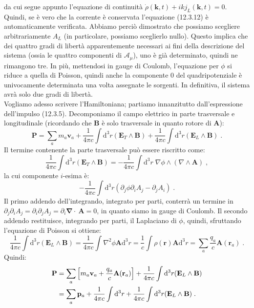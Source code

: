 \documentclass[10pt,a4paper]{report}
\theoremstyle{definition}
\numberwithin{equation}{section}
\newcommand{\diff}[1][]{\mathrm{d}#1}
\newcommand{\bnabla}{\boldsymbol{\nabla}}
\begin{document}
da cui segue appunto l'equazione di continuità $\dot{\rho}(\mathbf{k},t)+ikj_L(\mathbf{k},t)=0$. Quindi, se è vero che la corrente è conservata l'equazione (12.3.12) è automaticamente verificata. Abbiamo perciò dimostrato che possiamo scegliere arbitrariamente $A_L$ (in particolare, possiamo sceglierlo nullo). Questo implica che dei quattro gradi di libertà apparentemente necessari ai fini della descrizione del sistema (ossia le quattro componenti di $\mathcal{A}_{\mu}$), uno è già determinato, quindi ne rimangono tre. In più, mettendosi in gauge di Coulomb, l'equazione per $\phi$ si riduce a quella di Poisson, quindi anche la componente 0 del quadripotenziale è univocamente determinata una volta assegnate le sorgenti. In definitiva, il sistema avrà solo due gradi di libertà. \\
Vogliamo adesso scrivere l'Hamiltoniana; partiamo innanzitutto dall'espressione dell'impulso (12.3.5). Decomponiamo il campo elettrico in parte trasversale e longitudinale (ricordando che $\mathbf{B}$ è solo trasversale in quanto rotore di $\mathbf{A}$):
\begin{equation}
\mathbf{P}=\sum_a m_a\mathbf{v}_a+\frac{1}{4\pi c}\int\diff^3{r}(\mathbf{E}_T\wedge\mathbf{B})+\frac{1}{4\pi c}\int\diff^3{r}(\mathbf{E}_L\wedge\mathbf{B})\;.
\end{equation}
Il termine contenente la parte trasversale può essere riscritto come:
\begin{equation}
\frac{1}{4\pi c}\int\diff^3{r}(\mathbf{E}_T\wedge\mathbf{B})=-\frac{1}{4\pi c}\int\diff^3{r}\;\nabla\phi\wedge(\nabla\wedge\mathbf{A})\;,
\end{equation}
la cui componente $i$-esima è:
\begin{equation}
-\frac{1}{4\pi c}\int\diff^3{r}(\partial_j\phi\partial_iA_j-\partial_jA_i)\;.
\end{equation}
Il primo addendo dell'integrando, integrato per parti, conterrà un termine in $\partial_j\partial_iA_j=\partial_i\partial_jA_j=\partial_i\bnabla\cdot~\mathbf{A}=0$, in quanto siamo in gauge di Coulomb. Il secondo addendo restituisce, integrando per parti, il Laplaciano di $\phi$, quindi, sfruttando l'equazione di Poisson si ottiene:
\begin{equation}
\frac{1}{4\pi c}\int\diff^3{r}(\mathbf{E}_L\wedge\mathbf{B})=\frac{1}{4\pi c}\int \nabla^2\phi\mathbf{A}\diff^3{r}=\frac{1}{c}\int\rho(\mathbf{r})\mathbf{A}\diff^3{r}=\sum_a \frac{q_a}{c}\mathbf{A}(\mathbf{r}_a)\;.
\end{equation}
Quindi:
\begin{align}
\mathbf{P} &= \sum_a\left[m_a\mathbf{v}_a+\frac{q_a}{c}\mathbf{A}(\mathbf{r}_a)\right]+\frac{1}{4\pi c}\int\diff^3{r}(\mathbf{E}_L\wedge\mathbf{B}) \notag \\
&= \sum_a \mathbf{p}_a+\frac{1}{4\pi c}\int\diff^3{r}+\frac{1}{4\pi c}\int\diff^3{r}(\mathbf{E}_L\wedge\mathbf{B})\;.
\end{align}
\end{document}
